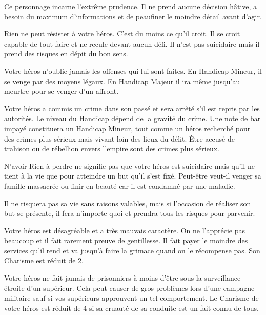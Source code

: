 \begin{description}[align=left]
    \item [Prudent (Mineur)]
        Ce personnage incarne l’extrême prudence. Il ne prend aucune décision hâtive, a besoin du maximum d’informations et de peaufiner le moindre détail avant d’agir.

    \item [Présomptueux (Majeur)]
        Rien ne peut résister à votre héros. C’est du moins ce qu’il croit. Il se croit capable de tout faire et ne recule devant aucun défi. Il n’est pas suicidaire mais il prend des risques en dépit du bon sens.

    \item [Rancunier (Mineur ou Majeur)]
        Votre héros n’oublie jamais les offenses qui lui sont faites. En Handicap Mineur, il se venge par des moyens légaux. En Handicap Majeur il ira même jusqu’au meurtre pour se venger d’un affront.

    \item [Recherché (Mineur ou Majeur)]
        Votre héros a commis un crime dans son passé et sera arrêté s’il est repris par les autorités. Le niveau du Handicap dépend de la gravité du crime. Une note de bar impayé constituera un Handicap Mineur, tout comme un héros recherché pour des crimes plus sérieux mais vivant loin des lieux du délit. \^Etre accusé de trahison ou de rébellion envers l’empire sont des crimes plus sérieux.

    \item [Rien à perdre (Mineur)]
        N’avoir Rien à perdre ne signifie pas que votre héros est suicidaire mais qu’il ne tient à la vie que pour atteindre un but qu’il s’est fixé. Peut-être veut-il venger sa famille massacrée ou finir en beauté car il est condamné par une maladie.

        Il ne risquera pas sa vie sans raisons valables, mais si l’occasion de réaliser son but se présente, il fera n’importe quoi et prendra tous les risques pour parvenir.

    \item [Sale caractère (Mineur)]
        Votre héros est désagréable et a très mauvais caractère. On ne l’apprécie pas beaucoup et il fait rarement preuve de gentillesse. Il fait payer le moindre des services qu’il rend et va jusqu’à faire la grimace quand on le récompense pas. Son Charisme est réduit de 2.

    \item [Sanguinaire (Majeur)]
        Votre héros ne fait jamais de prisonniers à moins d’être sous la surveillance étroite d’un supérieur. Cela peut causer de gros problèmes lors d’une campagne militaire sauf si vos supérieurs approuvent un tel comportement. Le Charisme de votre héros est réduit de 4 si sa cruauté de sa conduite est un fait connu de tous.


\end{description}
